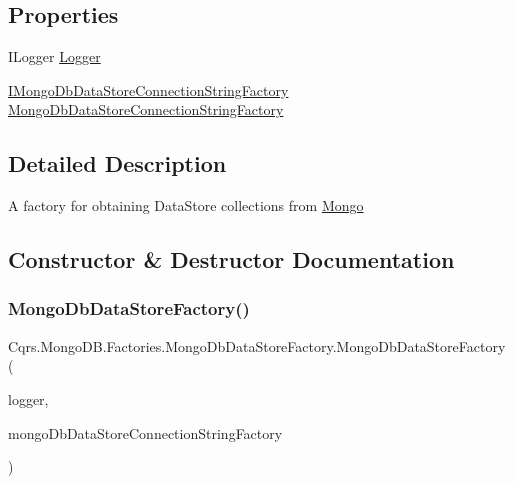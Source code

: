 \subsection*{Properties}
\begin{DoxyCompactItemize}
\item 
I\+Logger \hyperlink{classCqrs_1_1MongoDB_1_1Factories_1_1MongoDbDataStoreFactory_a2756ef3d362bd2c95193e113fa6f9e6d_a2756ef3d362bd2c95193e113fa6f9e6d}{Logger}
\item 
\hyperlink{interfaceCqrs_1_1MongoDB_1_1Factories_1_1IMongoDbDataStoreConnectionStringFactory}{I\+Mongo\+Db\+Data\+Store\+Connection\+String\+Factory} \hyperlink{classCqrs_1_1MongoDB_1_1Factories_1_1MongoDbDataStoreFactory_aa19c3db791da60ae4d91a1c667549de7_aa19c3db791da60ae4d91a1c667549de7}{Mongo\+Db\+Data\+Store\+Connection\+String\+Factory}
\end{DoxyCompactItemize}


\subsection{Detailed Description}
A factory for obtaining Data\+Store collections from \hyperlink{namespaceCqrs_1_1Mongo}{Mongo} 



\subsection{Constructor \& Destructor Documentation}
\mbox{\label{classCqrs_1_1MongoDB_1_1Factories_1_1MongoDbDataStoreFactory_a5306704647ba6dab35844231ca999b7e_a5306704647ba6dab35844231ca999b7e}} 
\subsubsection{\texorpdfstring{Mongo\+Db\+Data\+Store\+Factory()}{MongoDbDataStoreFactory()}}
{\footnotesize\ttfamily Cqrs.\+Mongo\+D\+B.\+Factories.\+Mongo\+Db\+Data\+Store\+Factory.\+Mongo\+Db\+Data\+Store\+Factory (\begin{DoxyParamCaption}\item[{I\+Logger}]{logger,  }\item[{\hyperlink{interfaceCqrs_1_1MongoDB_1_1Factories_1_1IMongoDbDataStoreConnectionStringFactory}{I\+Mongo\+Db\+Data\+Store\+Connection\+String\+Factory}}]{mongo\+Db\+Data\+Store\+Connection\+String\+Factory }\end{DoxyParamCaption})}



